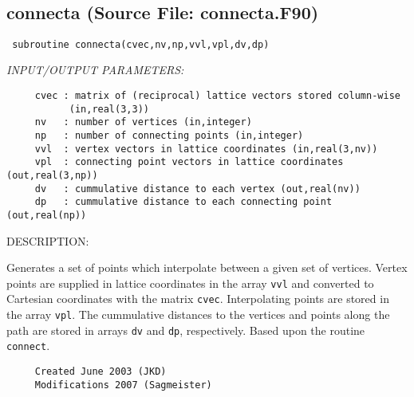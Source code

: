 \documentclass[11pt]{article}
\begin{document}



 
 
\mbox{}\hrulefill\ 
 
\subsection{connecta (Source File: connecta.F90)}


\begin{verbatim} subroutine connecta(cvec,nv,np,vvl,vpl,dv,dp)\end{verbatim}{\em INPUT/OUTPUT PARAMETERS:}
\begin{verbatim}     cvec : matrix of (reciprocal) lattice vectors stored column-wise
           (in,real(3,3))
     nv   : number of vertices (in,integer)
     np   : number of connecting points (in,integer)
     vvl  : vertex vectors in lattice coordinates (in,real(3,nv))
     vpl  : connecting point vectors in lattice coordinates (out,real(3,np))
     dv   : cummulative distance to each vertex (out,real(nv))
     dp   : cummulative distance to each connecting point (out,real(np))\end{verbatim}
{\sf DESCRIPTION:\\ }


     Generates a set of points which interpolate between a given set of vertices.
     Vertex points are supplied in lattice coordinates in the array {\tt vvl} and
     converted to Cartesian coordinates with the matrix {\tt cvec}. Interpolating
     points are stored in the array {\tt vpl}. The cummulative distances to the
     vertices and points along the path are stored in arrays {\tt dv} and
     {\tt dp}, respectively. Based upon the routine {\tt connect}.
  
\begin{verbatim}     Created June 2003 (JKD)
     Modifications 2007 (Sagmeister)\end{verbatim}





\end{document}
